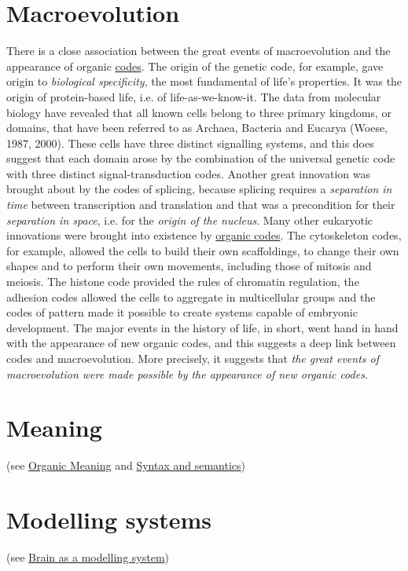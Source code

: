 \documentclass[12pt]{article}
\begin{document}
\section{Macroevolution} 
There is a close association between the great events of macroevolution and the appearance of organic \hyperlink{code}{codes}. The origin of the genetic code, for example, gave origin to \textit{biological specificity}, the most fundamental of life's properties. It was the origin of protein-based life, i.e. of life-as-we-know-it. The data from molecular biology have revealed that all known cells belong to three primary kingdoms, or domains, that have been referred to as Archaea, Bacteria and Eucarya (Woese, 1987, 2000). These cells have three distinct signalling systems, and this does suggest that each domain arose by the combination of the universal genetic code with three distinct signal-transduction codes. Another great innovation was brought about by the codes of splicing, because splicing requires a \textit{separation in time} between transcription and translation and that was a precondition for their \textit{separation in space}, i.e. for the \textit{origin of the nucleus}. Many other eukaryotic innovations were brought into existence by \hyperlink{organic_codes}{organic codes}. The cytoskeleton codes, for example, allowed the cells to build their own scaffoldings, to change their own shapes and to perform their own movements, including those of mitosis and meiosis. The histone code provided the rules of chromatin regulation, the adhesion codes allowed the cells to aggregate in multicellular groups and the codes of pattern made it possible to create systems capable of embryonic development. The major events in the history of life, in short, went hand in hand with the appearance of new organic codes, and this suggests a deep link between codes and macroevolution. More precisely, it suggests that \textit{the great events of macroevolution were made possible by the appearance of new organic codes}. 


\hypertarget{meaning}{}
\section{Meaning} (see \hyperlink{organic meaning}{Organic Meaning} and \hyperlink{syntax_and_semantics}{Syntax and semantics})


\hypertarget{modelling_systems}{}
\section{Modelling systems} (see \hyperlink{brain_as_a_modelling_system}{Brain as a modelling system})
 
\end{document}
